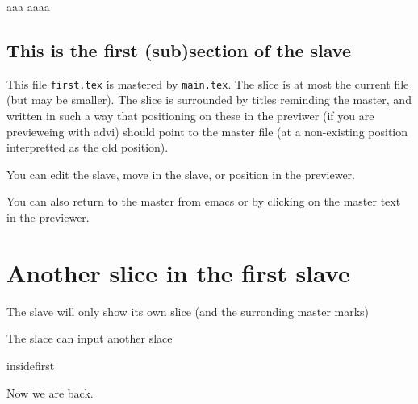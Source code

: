 

aaa aaaa

\subsection {This is the first (sub)section of the slave}

This file {\tt first.tex} is mastered by {\tt main.tex}.  The slice is at
most the current file (but may be smaller).  The slice is surrounded by
titles reminding the master, and written in such a way that positioning on
these in the previwer (if you are previeweing with advi) should point to the
master file (at a non-existing position interpretted as the old position).
 

You can edit the slave, move in the slave, or position in the previewer. 

You can also return to the master from emacs or by clicking on the master
text in the previewer. 

\section {Another slice in the first slave}

The slave will only show its own slice (and the surronding master marks)

The slace can input another slace

 {insidefirst}

Now we are back.

